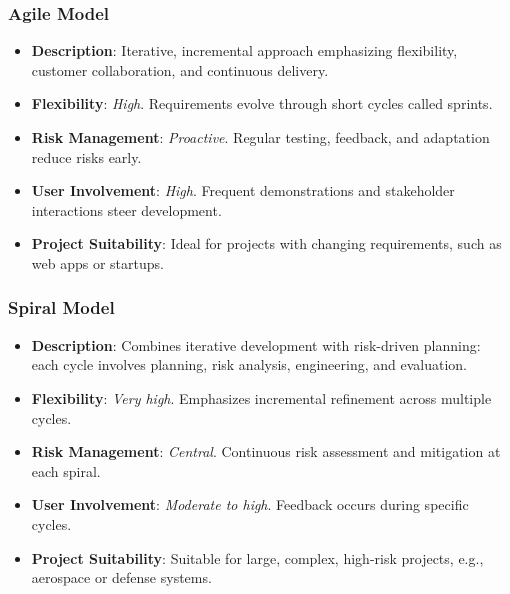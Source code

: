 \documentclass{beamer}
\begin{document}
\begin{frame}[fragile]
  \frametitle{Agile Model}
  
  \begin{itemize}
    \item \textbf{Description}: Iterative, incremental approach emphasizing flexibility, customer collaboration, and continuous delivery.
    \item \textbf{Flexibility}: \textit{High}. Requirements evolve through short cycles called sprints.
    \item \textbf{Risk Management}: \textit{Proactive}. Regular testing, feedback, and adaptation reduce risks early.
    \item \textbf{User Involvement}: \textit{High}. Frequent demonstrations and stakeholder interactions steer development.
    \item \textbf{Project Suitability}: Ideal for projects with changing requirements, such as web apps or startups.
  \end{itemize}
\end{frame}

\begin{frame}[fragile]
  \frametitle{Spiral Model}
  
  \begin{itemize}
    \item \textbf{Description}: Combines iterative development with risk-driven planning: each cycle involves planning, risk analysis, engineering, and evaluation.
    \item \textbf{Flexibility}: \textit{Very high}. Emphasizes incremental refinement across multiple cycles.
    \item \textbf{Risk Management}: \textit{Central}. Continuous risk assessment and mitigation at each spiral.
    \item \textbf{User Involvement}: \textit{Moderate to high}. Feedback occurs during specific cycles.
    \item \textbf{Project Suitability}: Suitable for large, complex, high-risk projects, e.g., aerospace or defense systems.
  \end{itemize}
\end{frame}
\end{document}
